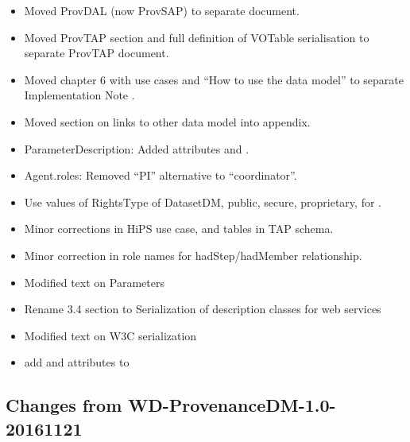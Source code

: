 \begin{itemize}
\item Moved ProvDAL (now ProvSAP) to separate document.
\item Moved ProvTAP section and full definition of VOTable serialisation to separate ProvTAP document.
\item Moved chapter 6 with use cases and ``How to use the data model'' to  separate Implementation Note \citep{std:ProvenanceImplementationNote}.
\item Moved section on links to other data model into appendix.
\item ParameterDescription: Added attributes  and .
\item Agent.roles: Removed ``PI'' alternative to ``coordinator''.
\item Use values of RightsType of DatasetDM, public, secure, proprietary, for .
\item Minor corrections in HiPS use case, 
and tables in TAP schema.
\item Minor correction in role names for hadStep/hadMember relationship.
\item Modified text on Parameters
\item Rename 3.4 section to Serialization of description classes for web services
\item Modified text on W3C serialization
\item add  and  attributes to 
\end{itemize}


\subsection{Changes from WD-ProvenanceDM-1.0-20161121}

